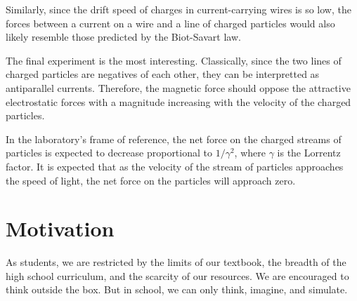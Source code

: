 \documentclass[12pt,letterpaper]{article}
\begin{document}
Similarly, since the drift speed of charges in current-carrying wires is so low, the forces between a current on a wire and a line of charged particles would also likely resemble those predicted by the Biot-Savart law.

The final experiment is the most interesting. Classically, since the two lines of charged particles are negatives of each other, they can be interpretted as antiparallel currents. Therefore, the magnetic force should oppose the attractive electrostatic forces with a magnitude increasing with the velocity of the charged particles.

In the laboratory's frame of reference, the net force on the charged streams of particles is expected to decrease proportional to $1/\gamma^2$, where $\gamma$ is the Lorrentz factor. It is expected that as the velocity of the stream of particles approaches the speed of light, the net force on the particles will approach zero.


\section{Motivation}

As students, we are restricted by the limits of our textbook, the breadth of the high school curriculum, and the scarcity of our resources. We are encouraged to think outside the box. But in school, we can only think, imagine, and simulate.
\end{document}
